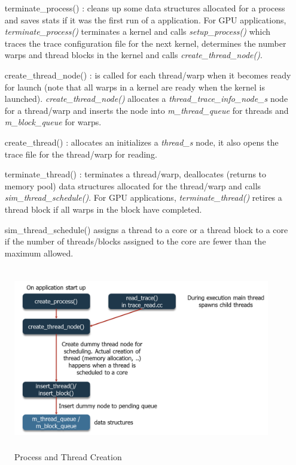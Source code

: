\begin{description}
\begin{itemize}
		\item [terminate\_process()]: cleans up some data structures allocated for a
		  process and saves stats if it was the first run of a application. For GPU
		  applications, \textit{terminate\_process()}  terminates a kernel and calls
		  \textit{setup\_process()} which traces the trace configuration file for the next
		  kernel, determines the number warps and thread blocks in the kernel and calls
		  \textit{create\_thread\_node()}.

		\item [create\_thread\_node()]: is called for each thread/warp when it becomes
			ready for launch (note that all warps in a kernel are ready when the kernel is
			launched). \textit{create\_thread\_node()} allocates a
			\textit{thread\_trace\_info\_node\_s} node for a thread/warp and inserts the
			node into \textit{m\_thread\_queue} for threads and \textit{m\_block\_queue}
			for warps.

		\item [create\_thread()]: allocates an initializes a \textit{thread\_s} node, it
			also opens the trace file for the thread/warp for reading.


		\item [terminate\_thread()]: terminates a thread/warp, deallocates (returns to
			memory pool) data structures allocated for the thread/warp and calls
			\textit{sim\_thread\_schedule()}. For GPU applications,
			\textit{terminate\_thread()} retires a thread block if all warps in the block
			have completed. 


		\item [sim\_thread\_schedule()] assigns a thread to a core or a thread block to
		  a core if the number of threads/blocks assigned to the core are fewer than the
		  maximum allowed.

	  \end{itemize}

\end{description}


\begin{figure}[htb]
\centering
\includegraphics[height=80mm]{figs/process_creation}
\caption{Process and Thread Creation}
\label{fig:process_creation}
\end{figure}

